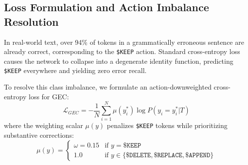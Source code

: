 \documentclass[10pt,journal,compsoc]{IEEEtran}
\begin{document}
\begin{table}[!t]
\centering
\caption{Progressive Growth Stages and Hyperparameter Configuration}
\label{tab:growth}
\end{table}

\subsection{Loss Formulation and Action Imbalance Resolution}
In real-world text, over 94\% of tokens in a grammatically erroneous sentence are already correct, corresponding to the \texttt{\$KEEP} action. Standard cross-entropy loss causes the network to collapse into a degenerate identity function, predicting \texttt{\$KEEP} everywhere and yielding zero error recall.

To resolve this class imbalance, we formulate an action-downweighted cross-entropy loss for GEC:
\begin{equation}
\mathcal{L}_{GEC} = -\frac{1}{N} \sum_{i=1}^N \mu(y_i^*) \log P(y_i = y_i^* | T)
\end{equation}
where the weighting scalar $\mu(y)$ penalizes \texttt{\$KEEP} tokens while prioritizing substantive corrections:
\begin{equation}
\mu(y) = \begin{cases} \omega = 0.15 & \text{if } y = \mathtt{\$KEEP} \\ 1.0 & \text{if } y \in \{\mathtt{\$DELETE}, \mathtt{\$REPLACE}, \mathtt{\$APPEND}\} \end{cases}
\end{equation}
\end{document}

